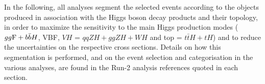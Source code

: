 In the following, all analyses segment the selected events according to the objects produced in association with the Higgs boson decay products and their topology, in order to maximize the sensitivity to the main Higgs production modes ($gg{\rm F}+b\bar{b}H$, VBF, $VH$ = $qqZH+ggZH+WH$ and top = $t\bar{t}H+tH$)  and to reduce the uncertainties on the respective cross sections. Details on how this segmentation is performed, and on the event selection and categorisation in the various analyses, are found in the Run-2 analysis references quoted in each section.
